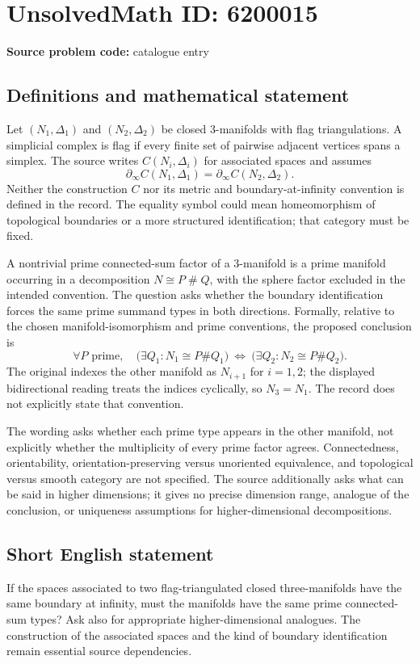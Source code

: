 \documentclass[11pt]{article}
\begin{document}
\section*{UnsolvedMath ID: 6200015}
\textbf{Source problem code:} catalogue entry
\subsection{Definitions and mathematical statement}
Let $(N_1,\Delta_1)$ and $(N_2,\Delta_2)$ be closed $3$-manifolds with flag triangulations. A simplicial complex is flag if every finite set of pairwise adjacent vertices spans a simplex. The source writes $C(N_i,\Delta_i)$ for associated spaces and assumes
\[
 \partial_\infty C(N_1,\Delta_1)
       =\partial_\infty C(N_2,\Delta_2).
\]
Neither the construction $C$ nor its metric and boundary-at-infinity convention is defined in the record. The equality symbol could mean homeomorphism of topological boundaries or a more structured identification; that category must be fixed.

A nontrivial prime connected-sum factor of a $3$-manifold is a prime manifold occurring in a decomposition $N\cong P\mathbin\# Q$, with the sphere factor excluded in the intended convention. The question asks whether the boundary identification forces the same prime summand types in both directions. Formally, relative to the chosen manifold-isomorphism and prime conventions, the proposed conclusion is
\[
 \forall P\text{ prime},\quad
 \bigl(\exists Q_1:N_1\cong P\#Q_1\bigr)
 \ \Longleftrightarrow\
 \bigl(\exists Q_2:N_2\cong P\#Q_2\bigr).
\]
The original indexes the other manifold as $N_{i+1}$ for $i=1,2$; the displayed bidirectional reading treats the indices cyclically, so $N_3=N_1$. The record does not explicitly state that convention.

The wording asks whether each prime type appears in the other manifold, not explicitly whether the multiplicity of every prime factor agrees. Connectedness, orientability, orientation-preserving versus unoriented equivalence, and topological versus smooth category are not specified. The source additionally asks what can be said in higher dimensions; it gives no precise dimension range, analogue of the conclusion, or uniqueness assumptions for higher-dimensional decompositions.
\subsection{Short English statement}
If the spaces associated to two flag-triangulated closed three-manifolds have the same boundary at infinity, must the manifolds have the same prime connected-sum types? Ask also for appropriate higher-dimensional analogues. The construction of the associated spaces and the kind of boundary identification remain essential source dependencies.
\end{document}
